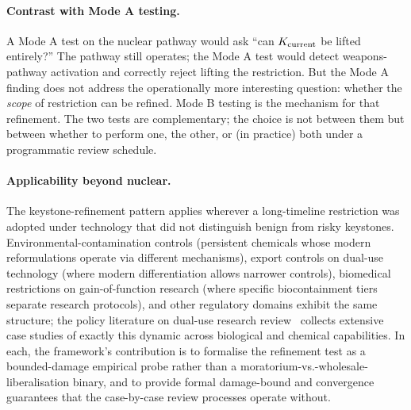 \paragraph{Contrast with Mode A testing.}
A Mode A test on the nuclear pathway would ask ``can
$K_{\mathrm{current}}$ be lifted entirely?''  The
pathway still operates; the Mode A test would detect weapons-pathway
activation and correctly reject lifting the restriction.  But the
Mode A finding does not address the operationally more interesting
question: whether the \emph{scope} of restriction can be refined.
Mode B testing is the mechanism for that refinement.  The two tests
are complementary; the choice is not between them but between
whether to perform one, the other, or (in practice) both under a
programmatic review schedule.

\paragraph{Applicability beyond nuclear.}
The keystone-refinement pattern applies wherever a long-timeline
restriction was adopted under technology that did not distinguish
benign from risky keystones.  Environmental-contamination controls
(persistent chemicals whose modern reformulations operate via
different mechanisms), export controls on dual-use technology
(where modern differentiation allows narrower controls), biomedical
restrictions on gain-of-function research (where specific
biocontainment tiers separate research protocols), and other
regulatory domains exhibit the same structure; the policy
literature on dual-use research review~\citep{tucker2012innovation}
collects extensive case studies of exactly this dynamic across
biological and chemical capabilities.  In each, the framework's
contribution is to formalise the refinement test as a
bounded-damage empirical probe rather than a
moratorium-vs.-wholesale-liberalisation binary, and to provide
formal damage-bound and convergence guarantees that the
case-by-case review processes operate without.
